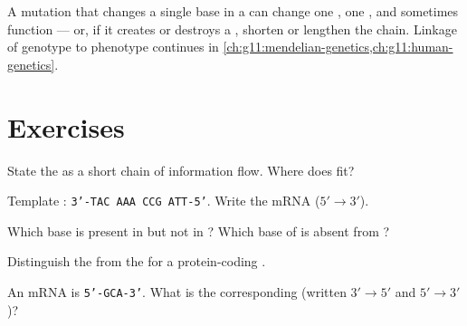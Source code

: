 \begin{remark}
A mutation that changes a single base in a  can change one , one , and sometimes  function --- or, if it creates or destroys a , shorten or lengthen the chain. Linkage of genotype to phenotype continues
in \cref{ch:g11:mendelian-genetics,ch:g11:human-genetics}.
\end{remark}

\section{Exercises}

\begin{exercise}[$\star$]\label{exo:g11:gene-expression:1}
State the  as a short chain of information flow. Where does
 fit?
\end{exercise}

\begin{exercise}[$\star$]\label{exo:g11:gene-expression:2}
Template : \texttt{3'-TAC AAA CCG ATT-5'}. Write the mRNA 
($5'\to 3'$).
\end{exercise}

\begin{exercise}[$\star$]\label{exo:g11:gene-expression:3}
Which base is present in  but not in ? Which base of  is absent from
?
\end{exercise}

\begin{exercise}[$\star\star$]\label{exo:g11:gene-expression:4}
Distinguish the   from the  for a protein-coding
.
\end{exercise}

\begin{exercise}[$\star\star$]\label{exo:g11:gene-expression:5}
An mRNA  is \texttt{5'-GCA-3'}. What is the corresponding  
(written $3'\to 5'$ and $5'\to 3'$)?
\end{exercise}

